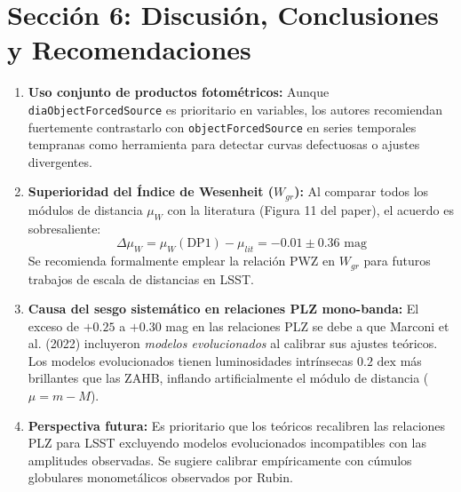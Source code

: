 \documentclass[11pt,a4paper]{article}
\begin{document}
\section{Sección 6: Discusión, Conclusiones y Recomendaciones}
\begin{enumerate}
    \item \textbf{Uso conjunto de productos fotométricos:} Aunque \texttt{diaObjectForcedSource} es prioritario en variables, los autores recomiendan fuertemente contrastarlo con \texttt{objectForcedSource} en series temporales tempranas como herramienta para detectar curvas defectuosas o ajustes divergentes.
    \item \textbf{Superioridad del Índice de Wesenheit ($W_{gr}$):}
    Al comparar todos los módulos de distancia $\mu_W$ con la literatura (Figura 11 del paper), el acuerdo es sobresaliente:
    \begin{equation*}
        \Delta\mu_W = \mu_W(\text{DP1}) - \mu_{lit} = -0.01 \pm 0.36\text{ mag}
    \end{equation*}
    Se recomienda formalmente emplear la relación PWZ en $W_{gr}$ para futuros trabajos de escala de distancias en LSST.
    \item \textbf{Causa del sesgo sistemático en relaciones PLZ mono-banda:}
    El exceso de $+0.25$ a $+0.30$ mag en las relaciones PLZ se debe a que Marconi et al. (2022) incluyeron \textit{modelos evolucionados} al calibrar sus ajustes teóricos. Los modelos evolucionados tienen luminosidades intrínsecas $0.2\text{ dex}$ más brillantes que las ZAHB, inflando artificialmente el módulo de distancia ($\mu = m - M$).
    \item \textbf{Perspectiva futura:} Es prioritario que los teóricos recalibren las relaciones PLZ para LSST excluyendo modelos evolucionados incompatibles con las amplitudes observadas. Se sugiere calibrar empíricamente con cúmulos globulares monometálicos observados por Rubin.
\end{enumerate}
\end{document}
